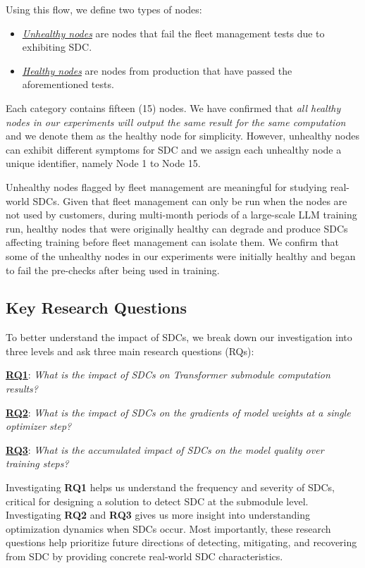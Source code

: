 Using this flow, we define two types of nodes:
\begin{itemize}
    \item \underline{\emph{Unhealthy nodes}} are nodes that fail the fleet management tests due to exhibiting SDC. 
    \item \underline{\emph{Healthy nodes}} are nodes from production that have passed the aforementioned tests. 
\end{itemize}
Each category contains fifteen (15) nodes. We have confirmed that \emph{all healthy nodes in our experiments will output the same result for the same computation} and we denote them as the healthy node for simplicity. However, unhealthy nodes can exhibit different symptoms for SDC and we assign each unhealthy node a unique identifier, namely Node 1 to Node 15. 

Unhealthy nodes flagged by fleet management are meaningful for studying real-world SDCs. Given that fleet management can only be run when the nodes are not used by customers, during multi-month periods of a large-scale LLM training run, healthy nodes that were originally healthy can degrade and produce SDCs affecting training before fleet management can isolate them.
We confirm that some of the unhealthy nodes in our experiments were initially healthy and began to fail the pre-checks after being used in training.

\subsection{Key Research Questions} \label{sec:research_questions}
To better understand the impact of SDCs, we break down our investigation into three levels and ask three main research questions (RQs):

\underline{\textbf{RQ1}}: \emph{What is the impact of SDCs on Transformer submodule computation results?}

\underline{\textbf{RQ2}}: \emph{What is the impact of SDCs on the gradients of model weights at a single optimizer step?} 

\underline{\textbf{RQ3}}: \emph{What is the accumulated impact of SDCs on the model quality over training steps?}

Investigating \textbf{RQ1} helps us understand the frequency and severity of SDCs, critical for designing a solution to detect SDC at the submodule level. Investigating \textbf{RQ2} and \textbf{RQ3} gives us more insight into understanding optimization dynamics when SDCs occur.
Most importantly, these research questions help prioritize future directions of detecting, mitigating, and recovering from SDC by providing concrete real-world SDC characteristics.

